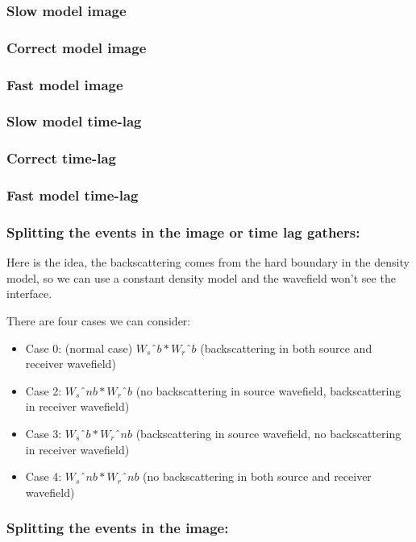 \begin{frame} \frametitle{Slow model image    }  \end{frame}
\begin{frame} \frametitle{Correct model image}  \end{frame}
\begin{frame} \frametitle{Fast model image     }  \end{frame}

\begin{frame} \frametitle{Slow model time-lag}  \end{frame}
\begin{frame} \frametitle{Correct time-lag      }  \end{frame}
\begin{frame} \frametitle{Fast model time-lag }  \end{frame}


\begin{frame} \frametitle{ Splitting the events in the image or time lag gathers:}

Here is the idea, the backscattering comes from the hard boundary in the density model, so we 
can use a constant density model and the wavefield won't see the interface.

There are four cases we can consider: 
\begin{itemize}
	\item Case 0: (normal case) $W_{s}ˆ{b} * W_{r}ˆ{b}$ (backscattering in both source and receiver wavefield)
	\item Case 2: $W_{s}ˆ{nb} * W_{r}ˆ{b}$ (no backscattering in source wavefield, backscattering in receiver wavefield)
	\item Case 3: $W_{s}ˆ{b} * W_{r}ˆ{nb}$ (backscattering in source wavefield, no backscattering in receiver wavefield)
	\item Case 4: $W_{s}ˆ{nb} * W_{r}ˆ{nb}$ (no backscattering in both source and receiver wavefield)
\end{itemize}
\end{frame}



\begin{frame}
\begin{center}
 \frametitle{ Splitting the events in the image:} 
\end{center}
\end{frame}

